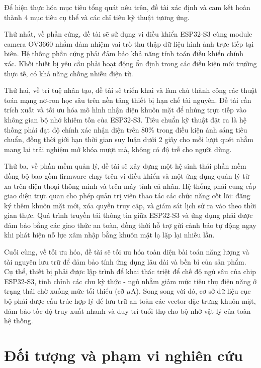 Để hiện thực hóa mục tiêu tổng quát nêu trên, đề tài xác định và cam kết hoàn thành 4 mục tiêu cụ thể và các chỉ tiêu kỹ thuật tương ứng.

Thứ nhất, về phần cứng, đề tài sẽ sử dụng vi điều khiển ESP32-S3 cùng module camera OV3660 nhằm đảm nhiệm vai trò thu thập dữ liệu hình ảnh trực tiếp tại biên. Hệ thống phần cứng phải đảm bảo khả năng tính toán điều khiển chính xác. Khối thiết bị yêu cầu phải hoạt động ổn định trong các điều kiện môi trường thực tế, có khả năng chống nhiễu điện từ.

Thứ hai, về trí tuệ nhân tạo, đề tài sẽ triển khai và làm chủ thành công các thuật toán mạng nơ-ron học sâu trên nền tảng thiết bị hạn chế tài nguyên. Đề tài cần trích xuất và tối ưu hóa mô hình nhận diện khuôn mặt để nhúng trực tiếp vào không gian bộ nhớ khiêm tốn của ESP32-S3. Tiêu chuẩn kỹ thuật đặt ra là hệ thống phải đạt độ chính xác nhận diện trên 80\% trong điều kiện ánh sáng tiêu chuẩn, đồng thời giới hạn thời gian suy luận dưới 2 giây cho mỗi lượt quét nhằm mang lại trải nghiệm mở khóa mượt mà, không có độ trễ cho người dùng.

Thứ ba, về phần mềm quản lý, đề tài sẽ xây dựng một hệ sinh thái phần mềm đồng bộ bao gồm firmware chạy trên vi điều khiển và một ứng dụng quản lý từ xa trên điện thoại thông minh và trên máy tính cá nhân. Hệ thống phải cung cấp giao diện trực quan cho phép quản trị viên thao tác các chức năng cốt lõi: đăng ký thêm khuôn mặt mới, xóa quyền truy cập, và giám sát lịch sử ra vào theo thời gian thực. Quá trình truyền tải thông tin giữa ESP32-S3 và ứng dụng phải được đảm bảo bằng các giao thức an toàn, đồng thời hỗ trợ gửi cảnh báo tự động ngay khi phát hiện nỗ lực xâm nhập bằng khuôn mặt lạ lặp lại nhiều lần.

Cuối cùng, về tối ưu hóa, đề tài sẽ tối ưu hóa toàn diện bài toán năng lượng và tài nguyên lưu trữ để đảm bảo tính ứng dụng lâu dài và bền bỉ của sản phẩm. Cụ thể, thiết bị phải được lập trình để khai thác triệt để chế độ ngủ sâu của chip ESP32-S3, tinh chỉnh các chu kỳ thức - ngủ nhằm giảm mức tiêu thụ điện năng ở trạng thái chờ xuống mức tối thiểu (cỡ $\mu$A). Song song với đó, cơ sở dữ liệu cục bộ phải được cấu trúc hợp lý để lưu trữ an toàn các vector đặc trưng khuôn mặt, đảm bảo tốc độ truy xuất nhanh và duy trì tuổi thọ cho bộ nhớ vật lý của toàn hệ thống.

\section{Đối tượng và phạm vi nghiên cứu}

